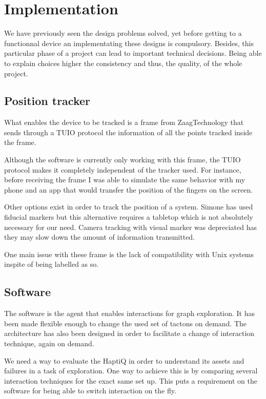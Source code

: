 \chapter{Implementation}

We have previously seen the design problems solved, yet before getting to a functionnal device an implementating these designs is compulsory. Besides, this particular phase of a project can lead to important technical decisions. Being able to explain choices higher the consistency and thus, the quality, of the whole project.


\section{Position tracker}\label{tracker}

What enables the device to be tracked is a frame from ZaagTechnology
that sends through a TUIO protocol the information of all the points
tracked inside the frame.

Although the software is currently only working with this frame, the TUIO protocol makes it completely independent of the tracker used. For instance, before receiving the frame I was able to simulate
the same behavior with my phone and an app that would transfer the position of the fingers on the screen.

Other options exist in order to track the position of a system. Simone has used fiducial markers but this alternative requires a tabletop which is not absolutely necessary for our need. Camera tracking with visual marker was depreciated has they may slow down the amount of information transmitted.

One main issue with these frame is the lack of compatibility with Unix systems inspite of being labelled as so.

\section{Software}\label{implementation-software}


The software is the agent that enables interactions for graph
exploration. It has been made flexible enough to change the used set of
tactons on demand. The architecture has also been designed in order to
facilitate a change of interaction technique, again on demand.

We need a way to evaluate the HaptiQ in order to understand its assets
and failures in a task of exploration. One way to achieve this is by
comparing several interaction techniques for the exact same set up. This
puts a requirement on the software for being able to switch interaction on the fly.

